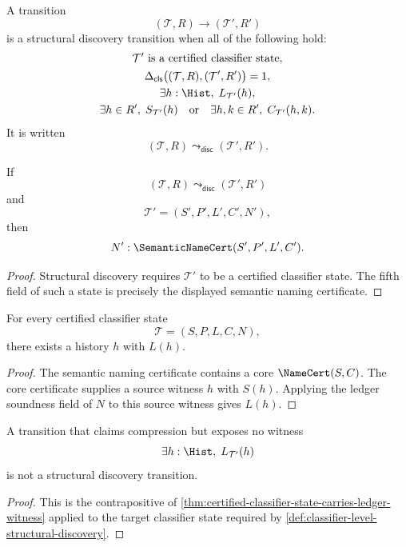 \begin{definition}
\label{def:classifier-level-structural-discovery}
A transition
$$
(\mathcal T,R)\longrightarrow(\mathcal T',R')
$$
is a structural discovery transition when all of the following hold:
$$
\begin{gathered}
\mathcal T' \text{ is a certified classifier state},\\
\Delta_{\mathsf{cls}}\bigl((\mathcal T,R),(\mathcal T',R')\bigr)=1,\\
\exists h:\Hist,\;L_{\mathcal T'}(h),\\
\exists h\in R',\;S_{\mathcal T'}(h)
\quad\text{or}\quad
\exists h,k\in R',\;C_{\mathcal T'}(h,k).
\end{gathered}
$$
It is written
$$
(\mathcal T,R)\leadsto_{\mathsf{disc}}(\mathcal T',R').
$$
\end{definition}

\begin{theorem}
\label{thm:classifier-level-discovery-carries-namecert}
If
$$
(\mathcal T,R)\leadsto_{\mathsf{disc}}(\mathcal T',R')
$$
and
$$
\mathcal T'=(S',P',L',C',N'),
$$
then
$$
N':\SemanticNameCert(S',P',L',C').
$$
\end{theorem}
\begin{proof}
Structural discovery requires $\mathcal T'$ to be a certified classifier
state. The fifth field of such a state is precisely the displayed semantic
naming certificate.
\end{proof}

\begin{theorem}
\label{thm:certified-classifier-state-carries-ledger-witness}
For every certified classifier state
$$
\mathcal T=(S,P,L,C,N),
$$
there exists a history $h$ with $L(h)$.
\end{theorem}
\begin{proof}
The semantic naming certificate contains a core $\NameCert(S,C)$. The core
certificate supplies a source witness $h$ with $S(h)$. Applying the ledger
soundness field of $N$ to this source witness gives $L(h)$.
\end{proof}

\begin{corollary}
\label{cor:unledgered-compression-is-not-discovery}
A transition that claims compression but exposes no witness
$$
\exists h:\Hist,\;L_{\mathcal T'}(h)
$$
is not a structural discovery transition.
\end{corollary}
\begin{proof}
This is the contrapositive of
\autoref{thm:certified-classifier-state-carries-ledger-witness} applied to the
target classifier state required by
\autoref{def:classifier-level-structural-discovery}.
\end{proof}

